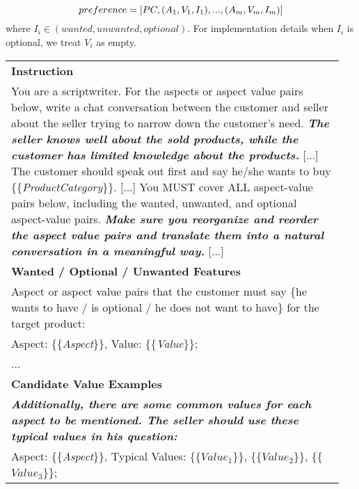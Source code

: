\begin{equation}  \small
    preference = [PC, (A_1,V_1,I_1), ..., (A_m,V_m,I_m)]
\end{equation}
where $I_i \in (wanted, unwanted, optional)$. For implementation details when $I_i$ is optional, we treat $V_i$ as empty.

\fi

\begin{table}%
\small
\begin{center}
    \begin{tabular}{p{0.95\linewidth} }
    \hline
    \textbf{Instruction} \\ 
    You are a scriptwriter. For the aspects or aspect value pairs below, write a chat conversation between the customer and seller about the seller trying to narrow down the customer's need. \textbf{\textit{The seller knows well about the sold products, while the customer has limited knowledge about the products.}} [...] The customer should speak out first and say he/she wants to buy \{\{\textit{ProductCategory}\}\}. [...] You MUST cover ALL aspect-value pairs below, including the wanted, unwanted, and optional aspect-value pairs. \textbf{\textit{Make sure you reorganize and reorder the aspect value pairs and translate them into a natural conversation in a meaningful way.}} [...]  \\ \hdashline
    \textbf{Wanted / Optional / Unwanted Features} \\ 
  Aspect or aspect value pairs that the customer must say \{he wants to have / is optional / he does not want to have\} for the target product:  \\ 
  Aspect: \{\{\textit{Aspect}\}\}, Value: \{\{\textit{Value}\}\}; \\ 
  ... \\\hdashline
  \textbf{Candidate Value Examples} \\ 
    \textbf{\textit{Additionally, there are some common values for each aspect to be mentioned. The seller should use these typical values in his question:}} \\
    Aspect: \{\{\textit{Aspect}\}\}, Typical Values: \{\{\textit{$Value_1$}\}\}, \{\{\textit{$Value_2$}\}\}, \{\{\textit{$Value_3$}\}\}; \\ 

\end{tabular}
\end{center}
\end{table}
